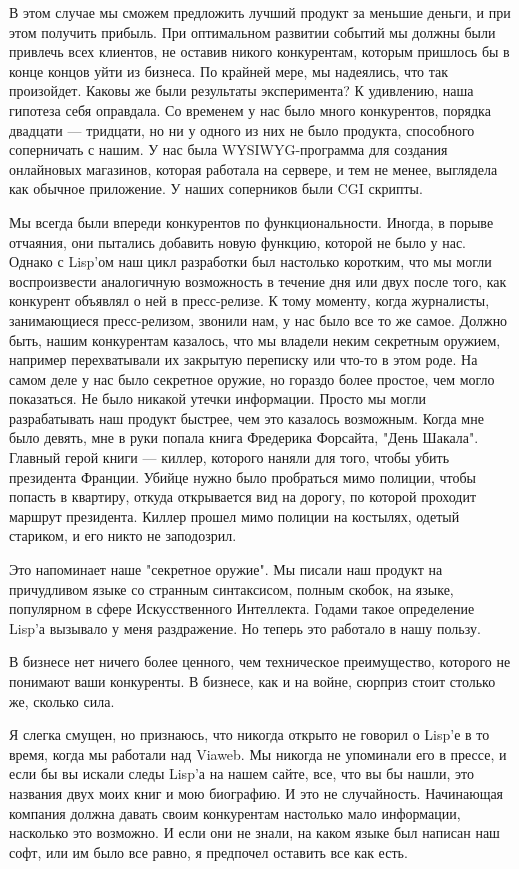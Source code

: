 \documentclass[ebook,12pt,oneside,openany]{memoir}
\begin{document}
В этом случае мы сможем предложить лучший продукт за меньшие деньги, и
при этом получить прибыль. При оптимальном развитии событий мы должны
были привлечь всех клиентов, не оставив никого конкурентам, которым
пришлось бы в конце концов уйти из бизнеса. По крайней мере, мы
надеялись, что так произойдет. Каковы же были результаты эксперимента?
К удивлению, наша гипотеза себя оправдала. Со временем у нас было
много конкурентов, порядка двадцати — тридцати, но ни у одного из них
не было продукта, способного соперничать с нашим. У нас была
WYSIWYG-программа для создания онлайновых магазинов, которая работала
на сервере, и тем не менее, выглядела как обычное приложение. У наших
соперников были CGI скрипты.

Мы всегда были впереди конкурентов по функциональности. Иногда, в
порыве отчаяния, они пытались добавить новую функцию, которой не было
у нас. Однако с Lisp'ом наш цикл разработки был настолько коротким,
что мы могли воспроизвести аналогичную возможность в течение дня или
двух после того, как конкурент объявлял о ней в пресс-релизе. К тому
моменту, когда журналисты, занимающиеся пресс-релизом, звонили нам, у
нас было все то же самое. Должно быть, нашим конкурентам казалось, что
мы владели неким секретным оружием, например перехватывали их закрытую
переписку или что-то в этом роде. На самом деле у нас было секретное
оружие, но гораздо более простое, чем могло показаться. Не было
никакой утечки информации. Просто мы могли разрабатывать наш продукт
быстрее, чем это казалось возможным. Когда мне было девять, мне в руки
попала книга Фредерика Форсайта, "День Шакала". Главный герой книги —
киллер, которого наняли для того, чтобы убить президента Франции.
Убийце нужно было пробраться мимо полиции, чтобы попасть в квартиру,
откуда открывается вид на дорогу, по которой проходит маршрут
президента. Киллер прошел мимо полиции на костылях, одетый стариком, и
его никто не заподозрил.

Это напоминает наше "секретное оружие". Мы писали наш продукт на
причудливом языке со странным синтаксисом, полным скобок, на языке,
популярном в сфере Искусственного Интеллекта. Годами такое определение
Lisp'а вызывало у меня раздражение. Но теперь это работало в нашу
пользу.

В бизнесе нет ничего более ценного, чем техническое преимущество,
которого не понимают ваши конкуренты. В бизнесе, как и на войне,
сюрприз стоит столько же, сколько сила.

Я слегка смущен, но признаюсь, что никогда открыто не говорил о Lisp'е
в то время, когда мы работали над Viaweb. Мы никогда не упоминали его
в прессе, и если бы вы искали следы Lisp'а на нашем сайте, все, что вы
бы нашли, это названия двух моих книг и мою биографию. И это не
случайность. Начинающая компания должна давать своим конкурентам
настолько мало информации, насколько это возможно. И если они не
знали, на каком языке был написан наш софт, или им было все равно, я
предпочел оставить все как есть.
\end{document}
